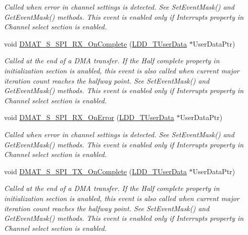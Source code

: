 \begin{DoxyCompactItemize}
\begin{DoxyCompactList}\small\item\em Called when error in channel settings is detected. See Set\-Event\-Mask() and Get\-Event\-Mask() methods. This event is enabled only if Interrupts property in Channel select section is enabled. \end{DoxyCompactList}\item 
void \hyperlink{group___events__module_gae35965160aeff0693a4eee5ddd97584f}{D\-M\-A\-T\-\_\-\-S\-\_\-\-S\-P\-I\-\_\-\-R\-X\-\_\-\-On\-Complete} (\hyperlink{group___p_e___types__module_ga0b66a73f87238a782318aa0be7578e35}{L\-D\-D\-\_\-\-T\-User\-Data} $\ast$User\-Data\-Ptr)
\begin{DoxyCompactList}\small\item\em Called at the end of a D\-M\-A transfer. If the Half complete property in initialization section is anabled, this event is also called when current major iteration count reaches the halfway point. See Set\-Event\-Mask() and Get\-Event\-Mask() methods. This event is enabled only if Interrupts property in Channel select section is enabled. \end{DoxyCompactList}\item 
void \hyperlink{group___events__module_ga4bf7764e25adf3a29cd3ccb084feee9c}{D\-M\-A\-T\-\_\-\-S\-\_\-\-S\-P\-I\-\_\-\-R\-X\-\_\-\-On\-Error} (\hyperlink{group___p_e___types__module_ga0b66a73f87238a782318aa0be7578e35}{L\-D\-D\-\_\-\-T\-User\-Data} $\ast$User\-Data\-Ptr)
\begin{DoxyCompactList}\small\item\em Called when error in channel settings is detected. See Set\-Event\-Mask() and Get\-Event\-Mask() methods. This event is enabled only if Interrupts property in Channel select section is enabled. \end{DoxyCompactList}\item 
void \hyperlink{group___events__module_ga0774ec3156b1a121218108baa8852a83}{D\-M\-A\-T\-\_\-\-S\-\_\-\-S\-P\-I\-\_\-\-T\-X\-\_\-\-On\-Complete} (\hyperlink{group___p_e___types__module_ga0b66a73f87238a782318aa0be7578e35}{L\-D\-D\-\_\-\-T\-User\-Data} $\ast$User\-Data\-Ptr)
\begin{DoxyCompactList}\small\item\em Called at the end of a D\-M\-A transfer. If the Half complete property in initialization section is anabled, this event is also called when current major iteration count reaches the halfway point. See Set\-Event\-Mask() and Get\-Event\-Mask() methods. This event is enabled only if Interrupts property in Channel select section is enabled. \end{DoxyCompactList}\item 

\end{DoxyCompactItemize}
